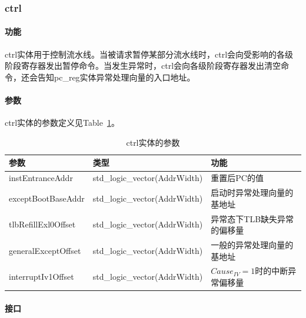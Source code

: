 \documentclass{article}
\begin{document}
\begin{spacing}{1.4}
\subsubsection{ctrl}

\paragraph{功能}\mbox{}

ctrl实体用于控制流水线。当被请求暂停某部分流水线时，ctrl会向受影响的各级阶段寄存器发出暂停命令。当发生异常时，ctrl会向各级阶段寄存器发出清空命令，还会告知pc\_reg实体异常处理向量的入口地址。

\paragraph{参数}\mbox{}

ctrl实体的参数定义见Table~\ref{tb:ctrl-parameter}。
\begin{table}[!htb]
\begin{center}
\begin{tabular*}{15cm}{l|l|l}
\hline
\textbf{参数}&\textbf{类型}&\textbf{功能} \\
\hline instEntranceAddr        & std\_logic\_vector(AddrWidth)    & 重置后PC的值 \\
\hline exceptBootBaseAddr      & std\_logic\_vector(AddrWidth)    & 启动时异常处理向量的基地址 \\
\hline tlbRefillExl0Offset     & std\_logic\_vector(AddrWidth)    & 异常态下TLB缺失异常的偏移量 \\
\hline generalExceptOffset     & std\_logic\_vector(AddrWidth)    & 一般的异常处理向量的基地址 \\
\hline interruptIv1Offset      & std\_logic\_vector(AddrWidth)    & $Cause_{IV}=1$时的中断异常偏移量 \\
\hline
\end{tabular*}
\caption{ctrl实体的参数}
\label{tb:ctrl-parameter}
\end{center}
\end{table}

\paragraph{接口}\mbox{}


\end{spacing}
\end{document}
